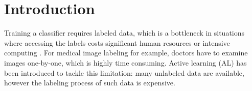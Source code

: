 \documentclass[twoside]{article}
\theoremstyle{definition}
\theoremstyle{remark}
\begin{document}
\section{Introduction}
\label{sec:intro}



Training a classifier requires labeled data, which is a bottleneck in situations where accessing the labels costs significant human resources or intensive computing \citep{casilliAttendantRobotsEnquete2019}. For medical image labeling for example, doctors have to examine images one-by-one, which is highly time consuming.
%
Active learning (AL) \citep{settlesActiveLearningLiterature2009, liSurveyDeepActive2024} has been introduced to tackle this limitation: many unlabeled data are available, however the labeling process of such data is expensive.
\end{document}
